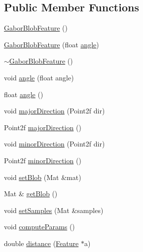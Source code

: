 \subsection*{Public Member Functions}
\begin{DoxyCompactItemize}
\item 
\hyperlink{class_gabor_blob_feature_a69e3ae10ed6cdd4d2a1263eccadf9c43}{Gabor\+Blob\+Feature} ()
\item 
\hyperlink{class_gabor_blob_feature_a3622476f0e482a1bae9efd0fe886f43b}{Gabor\+Blob\+Feature} (float \hyperlink{class_gabor_blob_feature_aeccf061ebe315eae8d9371cb0f80d3ed}{angle})
\item 
\hyperlink{class_gabor_blob_feature_a4e9516cce87a10ac9ae8094d6b00215f}{$\sim$\+Gabor\+Blob\+Feature} ()
\item 
void \hyperlink{class_gabor_blob_feature_aeccf061ebe315eae8d9371cb0f80d3ed}{angle} (float angle)
\item 
float \hyperlink{class_gabor_blob_feature_aab6f437b09cb5bb2788ea84dcb25ea9a}{angle} ()
\item 
void \hyperlink{class_gabor_blob_feature_ad3781ba28ee46dc9ee95481413d8f56a}{major\+Direction} (Point2f dir)
\item 
Point2f \hyperlink{class_gabor_blob_feature_a0e060ac23a33cc1edb3db7616c4ab818}{major\+Direction} ()
\item 
void \hyperlink{class_gabor_blob_feature_ac77bb0d685ec358947d98f2045950170}{minor\+Direction} (Point2f dir)
\item 
Point2f \hyperlink{class_gabor_blob_feature_ac68c416b9eb54df0e47421e86abd5bb6}{minor\+Direction} ()
\item 
void \hyperlink{class_gabor_blob_feature_a9494cf854702bf93ef07f169cbd65b01}{set\+Blob} (Mat \&mat)
\item 
Mat \& \hyperlink{class_gabor_blob_feature_aa501e837abb44fecf85e731147c97350}{get\+Blob} ()
\item 
void \hyperlink{class_gabor_blob_feature_a918d4aaee8cd2eda328d848f74431112}{set\+Samples} (Mat \&samples)
\item 
void \hyperlink{class_gabor_blob_feature_abe712f318a256f12d18a15ebf3fdf125}{compute\+Params} ()
\item 
double \hyperlink{class_gabor_blob_feature_ac9dd690e58da5a3a1c1f1964c2949a7c}{distance} (\hyperlink{class_feature}{Feature} $\ast$a)
\end{DoxyCompactItemize}


